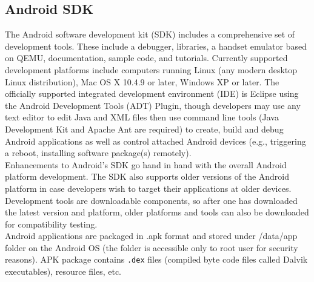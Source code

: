 \subsection{Android SDK}
\hspace*{0.82cm}The Android software development kit (SDK) includes a comprehensive set of development tools. These include a debugger, 
libraries, a handset emulator based on QEMU, documentation, sample code, and tutorials. Currently supported development platforms include 
computers running Linux (any modern desktop Linux distribution), Mac OS X 10.4.9 or later, Windows XP or later. The officially supported 
integrated development environment (IDE) is Eclipse using the Android Development Tools (ADT) Plugin, though developers may use any text 
editor to edit Java and XML files then use command line tools (Java Development Kit and Apache Ant are required) to create, build and debug 
Android applications as well as control attached Android devices (e.g., triggering a reboot, installing software package(s) remotely).\\[0.5cm]
\hspace*{0.82cm}Enhancements to Android's SDK go hand in hand with the overall Android platform development. The SDK also supports older 
versions of the Android platform in case developers wish to target their applications at older devices. Development tools are downloadable 
components, so after one has downloaded the latest version and platform, older platforms and tools can also be downloaded for compatibility 
testing.\\[0.5cm]
\hspace*{0.82cm}Android applications are packaged in .apk format and stored under /data/app folder on the Android OS (the folder is 
accessible only to root user for security reasons). APK package contains \texttt{.dex} files (compiled byte code files called Dalvik 
executables), resource files, etc.

